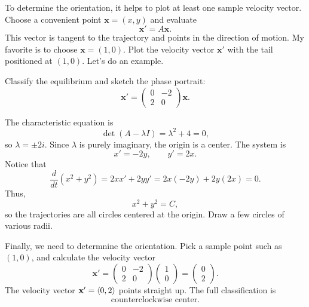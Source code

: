 \documentclass[11pt,letterpaper]{article}
\begin{document}
To determine the orientation, it helps to plot at least one sample velocity vector. Choose a convenient point $\textbf{x}=(x,y)$ and evaluate
\[
\mathbf{x}'=A\mathbf{x}.
\]
This vector is tangent to the trajectory and points in the direction of motion. My favorite is to choose $\textbf{x}=(1,0)$. Plot the velocity vector $\textbf{x}'$ with the tail positioned at $(1,0)$. Let's do an example.

\begin{example}[4]{
Classify the equilibrium and sketch the phase portrait:
\[
\mathbf{x}'=
\begin{pmatrix}
0&-2\\
2&0
\end{pmatrix}\mathbf{x}.
\]
}

The characteristic equation is
\[
\det(A-\lambda I)=\lambda^2+4=0,
\]
so $\lambda=\pm2i$. Since $\lambda$ is purely imaginary, the origin is a center.
The system is
\[
x'=-2y,\qquad y'=2x.
\]
Notice that
\[
\frac{d}{dt}(x^2+y^2)
=2xx'+2yy'
=2x(-2y)+2y(2x)=0.
\]
Thus,
\[
x^2+y^2=C,
\]
so the trajectories are all circles centered at the origin. Draw a few circles of various radii. 

Finally, we need to determnine the orientation. Pick a sample point such as $(1,0)$, and calculate the velocity vector
\[
\mathbf{x}'=
\begin{pmatrix}
0&-2\\
2&0
\end{pmatrix}
\begin{pmatrix}1\\0\end{pmatrix}
=
\begin{pmatrix}0\\2\end{pmatrix}.
\]
The velocity vector $\textbf{x}'=\left\langle 0,2\right\rangle$ points straight up. The full classification is 
\[
\boxed{\text{counterclockwise center}.}
\]

\begin{center}
\end{center}
\end{example}
\end{document}

